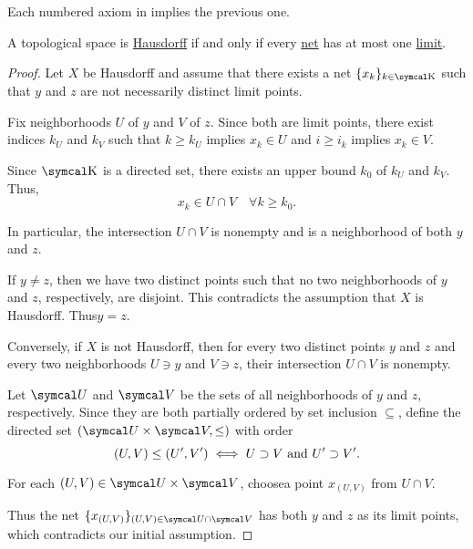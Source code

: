 \begin{proposition}\label{thm:separation_axioms_cascade}
  Each numbered axiom in  implies the previous one.
\end{proposition}

\begin{proposition}\label{thm:t2_iff_singleton_limits}
  A topological space is \hyperref[def:separation_axioms/T2]{Hausdorff} if and only if every \hyperref[def:topological_net]{net} has at most one \hyperref[def:net_convergence/limit]{limit}.
\end{proposition}
\begin{proof}
  \Sufficiency Let \( X \) be Hausdorff and assume that there exists a net \( \{ x_k \}_{k \in \CK} \) such that \( y \) and \( z \) are not necessarily distinct limit points.

  Fix neighborhoods \( U \) of \( y \) and \( V \) of \( z \). Since both are limit points, there exist indices \( k_U \) and \( k_V \) such that \( k \geq k_U \) implies \( x_k \in U \) and \( i \geq i_k \) implies \( x_k \in V \).

  Since \( \CK \) is a directed set, there exists an upper bound \( k_0 \) of \( k_U \) and \( k_V \). Thus,
  \begin{equation*}
    x_k \in U \cap V \quad\forall k \geq k_0.
  \end{equation*}

  In particular, the intersection \( U \cap V \) is nonempty and is a neighborhood of both \( y \) and \( z \).

  If \( y \neq z \), then we have two distinct points such that no two neighborhoods of \( y \) and \( z \), respectively, are disjoint. This contradicts the assumption that \( X \) is Hausdorff. Thus\LEM \( y = z \).

  \Necessity Conversely, if \( X \) is not Hausdorff\LEM, then for every two distinct points \( y \) and \( z \) and every two neighborhoods \( U \ni y \) and \( V \ni z \), their intersection \( U \cap V \) is nonempty.

  Let \( \Cal{U} \) and \( \Cal{V} \) be the sets of all neighborhoods of \( y \) and \( z \), respectively. Since they are both partially ordered by set inclusion \( \subseteq \), define the directed set \( (\Cal{U} \times \Cal{V}, \leq) \) with order
  \begin{equation*}
    (U, V) \leq (U', V') \iff U \supset V \text{ and } U' \supset V'.
  \end{equation*}

  For each \( (U, V) \in \Cal{U} \times \Cal{V} \), choose\AOC a point \( x_{(U, V)} \) from \( U \cap V \).

  Thus the net \( \{ x_{(U, V)} \}_{(U, V) \in \Cal{U} \cap \Cal{V}} \) has both \( y \) and \( z \) as its limit points, which contradicts our initial assumption.
\end{proof}

